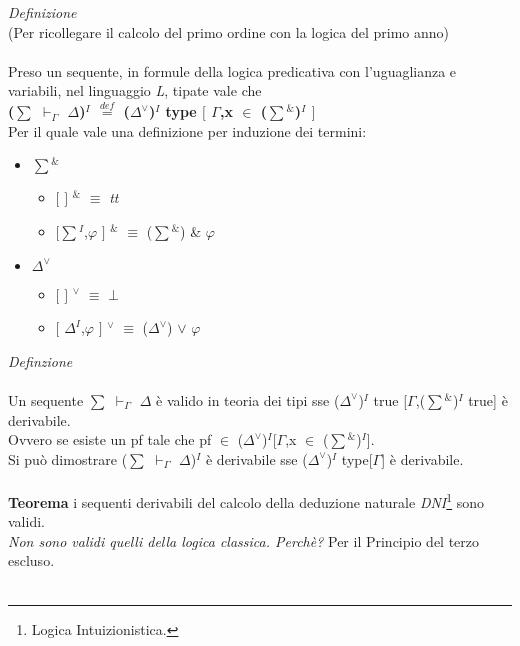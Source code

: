\noindent \textit{Definizione}\\
(Per ricollegare il calcolo del primo ordine con la logica del primo anno)\\\\
\noindent 
Preso un sequente, in formule della logica predicativa con l'uguaglianza  e variabili, nel linguaggio \textit{L}, tipate vale che\\
\textbf{({\scriptsize$\sum$} $\vdash_\Gamma$ $\Delta$)$^I$ ${\overset{\mathit{def}}{=}}$ ($\Delta^\vee$)$^I$ type $[$ $\Gamma$,x $\in$ ({\scriptsize$\sum$}$^\&$)$^I$ $]$}\\
Per il quale vale una definizione per induzione dei termini:
\begin{itemize}
\item {\scriptsize$\sum$}$^\&$
\begin{itemize}
\item $[$ $]$ $^\&$ $\equiv$ \textit{tt}
\item $[${\scriptsize$\sum$}$^I$,$\varphi$ $]$ $^\&$ $\equiv$ ({\scriptsize$\sum$}$^\&$) \& $\varphi$
\end{itemize}
\item $\Delta^\vee$
\begin{itemize}
\item $[$ $]$ $^\vee$ $\equiv$ \textit{$\bot$}
\item $[$ $\Delta^I$,$\varphi$ $]$ $^\vee$ $\equiv$ ($\Delta^\vee$) $\vee$ $\varphi$
\end{itemize}
\end{itemize}
\noindent
\newpage
\noindent \textit{Definzione}\\\\
\noindent Un sequente {\scriptsize$\sum$} $\vdash_\Gamma$ $\Delta$ \`e valido in teoria dei tipi sse ($\Delta^\vee$)$^I$ true [$\Gamma$,({\scriptsize$\sum$}$^\&$)$^I$ true] \`e derivabile.\\
Ovvero se esiste un pf tale che pf $\in$ ($\Delta^\vee$)$^I$[$\Gamma$,x $\in$ ({\scriptsize$\sum$}$^\&$)$^I$].\\
Si pu\`o dimostrare ({\scriptsize$\sum$} $\vdash_\Gamma$ $\Delta$)$^I$ \`e derivabile sse ($\Delta^\vee$)$^I$ type[$\Gamma$] \`e derivabile.
\\\\
\noindent
\textbf{Teorema} i sequenti derivabili del calcolo della deduzione naturale \textit{DNI}\footnote{Logica Intuizionistica.} sono validi.\\
\textit{Non sono validi quelli della logica classica. Perch\`e?} Per il Principio del terzo escluso.\\\\
